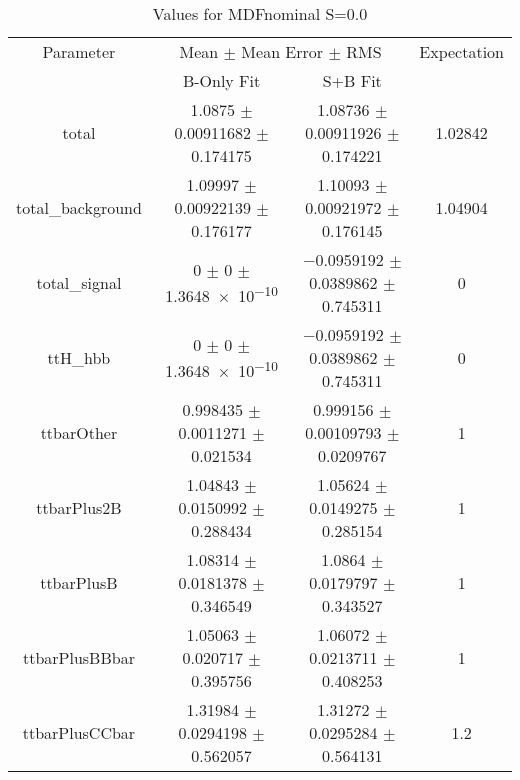 \begin{table}
\centering
\caption{Values for MDFnominal S=0.0}
\begin{tabular}{cccc}
\toprule
Parameter & \multicolumn{2}{c}{Mean $\pm$ Mean Error $\pm$ RMS} & Expectation\\
 & B-Only Fit & S+B Fit & \\
\midrule
total & \num{1.0875} $\pm$ \num{0.00911682} $\pm$ \num{0.174175} & \num{1.08736} $\pm$ \num{0.00911926} $\pm$ \num{0.174221} & \num{1.02842}\\
total\_background & \num{1.09997} $\pm$ \num{0.00922139} $\pm$ \num{0.176177} & \num{1.10093} $\pm$ \num{0.00921972} $\pm$ \num{0.176145} & \num{1.04904}\\
total\_signal & \num{0} $\pm$ \num{0} $\pm$ \num{1.3648e-10} & \num{-0.0959192} $\pm$ \num{0.0389862} $\pm$ \num{0.745311} & \num{0}\\
ttH\_hbb & \num{0} $\pm$ \num{0} $\pm$ \num{1.3648e-10} & \num{-0.0959192} $\pm$ \num{0.0389862} $\pm$ \num{0.745311} & \num{0}\\
ttbarOther & \num{0.998435} $\pm$ \num{0.0011271} $\pm$ \num{0.021534} & \num{0.999156} $\pm$ \num{0.00109793} $\pm$ \num{0.0209767} & \num{1}\\
ttbarPlus2B & \num{1.04843} $\pm$ \num{0.0150992} $\pm$ \num{0.288434} & \num{1.05624} $\pm$ \num{0.0149275} $\pm$ \num{0.285154} & \num{1}\\
ttbarPlusB & \num{1.08314} $\pm$ \num{0.0181378} $\pm$ \num{0.346549} & \num{1.0864} $\pm$ \num{0.0179797} $\pm$ \num{0.343527} & \num{1}\\
ttbarPlusBBbar & \num{1.05063} $\pm$ \num{0.020717} $\pm$ \num{0.395756} & \num{1.06072} $\pm$ \num{0.0213711} $\pm$ \num{0.408253} & \num{1}\\
ttbarPlusCCbar & \num{1.31984} $\pm$ \num{0.0294198} $\pm$ \num{0.562057} & \num{1.31272} $\pm$ \num{0.0295284} $\pm$ \num{0.564131} & \num{1.2}\\
\bottomrule
\end{tabular}
\end{table}